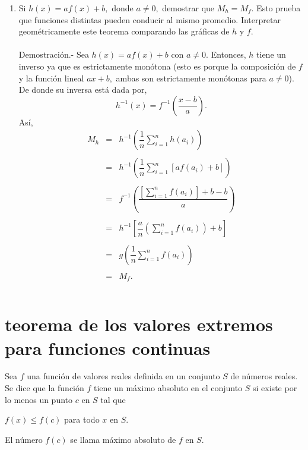 \begin{enumerate}[\bfseries 1.]
    \item Si $h(x)=af(x)+b,$ donde $a\neq 0,$ demostrar que $M_h=M_f$. Esto prueba que funciones distintas pueden conducir al mismo promedio. Interpretar geométricamente este teorema comparando las gráficas de $h$ y $f.$\\\\
	Demostración.-\; Sea $h(x)=af(x)+b$ con $a\neq 0$. Entonces, $h$ tiene un inverso ya que es estrictamente monótona (esto es porque la composición de $f$ y la función lineal $ax+b,$ ambas son estrictamente monótonas para $a\neq 0$). De donde su inversa está dada por,
	$$h^{-1}(x)=f^{-1}\left(\dfrac{x-b}{a}\right).$$
	Así,
	$$\begin{array}{rcl}
	    M_h &=& h^{-1}\left(\dfrac{1}{n}\sum_{i=1}^n h(a_i)\right)\\\\
		&=& h^{-1}\left(\dfrac{1}{n}\sum_{i=1}^n [af(a_i)+b]\right)\\\\
		&=&f^{-1} \left(\dfrac{\left[\sum_{i=1}^n f(a_i)\right]+b-b}{a}\right)\\\\
		&=& h^{-1}\left[\dfrac{a}{n}\left(\sum_{i=1}^n f(a_i)\right)+b\right]\\\\
		&=& g\left(\dfrac{1}{n}\sum_{i=1}^n f(a_i)\right)\\\\
		&=& M_f.\\\\
	\end{array}$$

\end{enumerate}


\section{teorema de los valores extremos para funciones continuas}

    \begin{def.}
	Sea $f$ una función de valores reales definida en un conjunto $S$ de números reales. Se dice que la función $f$ tiene un máximo absoluto en el conjunto $S$ si existe por lo menos un punto $c$ en $S$ tal que 
	\begin{center}
	    $f(x)\leq f(c)$ para todo $x$ en $S$.
	\end{center}
	El número $f(c)$ se llama máximo absoluto de $f$ en $S$. 
    \end{def.}

